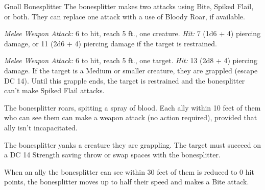 \documentclass[10pt,a4paper,twoside,bg=print,twocolumn,openany,nodeprecatedcode]{dndbook}
\begin{document}
\begin{DndMonster}[float=t]{Gnoll Bonesplitter}
\DndMonsterBasics[
armor-class = {13 (\textit{hide armor})},
hit-points = {\DndDice{12d8 + 36}},
speed = {30 ft.}
]
\DndMonsterAbilityScores[
 str = 18,
 dex = 12,
 con = 17,
 int = 10,
 wis = 12,
 cha = 12
]
\DndMonsterDetails[
saving-throws = {Con +5},
senses = {darkvision 60 ft., passive perception 11},
languages = {Abyssal, Gnoll},
challenge = 4,
]
The bonesplitter makes two attacks using Bite, Spiked Flail, or both. They can replace one attack with a use of Bloody Roar, if available.

\textsl{Melee Weapon Attack:} 6 to hit, reach 5 ft., one creature. \textsl{Hit:} 7 (1d6 + 4) piercing damage, or 11 (2d6 + 4) piercing damage if the target is restrained.

\textsl{Melee Weapon Attack:} 6 to hit, reach 5 ft., one target. \textsl{Hit:} 13 (2d8 + 4) piercing damage. If the target is a Medium or smaller creature, they are grappled (escape DC 14). Until this grapple ends, the target is restrained and the bonesplitter can't make Spiked Flail attacks.

The bonesplitter roars, spitting a spray of blood. Each ally within 10 feet of them who can see them can make a weapon attack (no action required), provided that ally isn't incapacitated.

The bonesplitter yanks a creature they are grappling. The target must succeed on a DC 14 Strength saving throw or swap spaces with the bonesplitter.

When an ally the bonesplitter can see within 30 feet of them is reduced to 0 hit points, the bonesplitter moves up to half their speed and makes a Bite attack.

\end{DndMonster}
\end{document}
